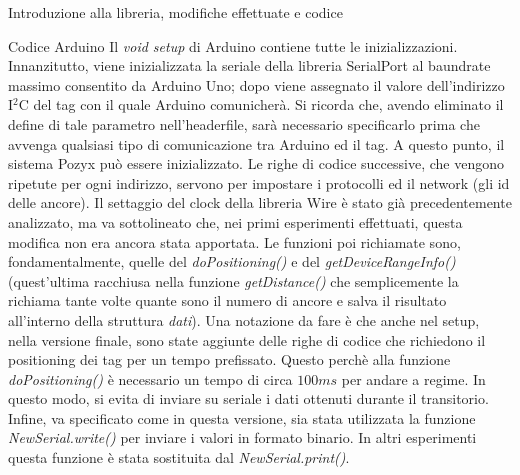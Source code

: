 \documentclass[12pt]{report}
\begin{document}
\begin{section}{Introduzione alla libreria, modifiche effettuate e codice}
\begin{subsection}{Codice Arduino}
			Il \textit{void setup} di Arduino contiene tutte le inizializzazioni. Innanzitutto, viene inizializzata la seriale della libreria SerialPort al baundrate massimo consentito da Arduino Uno; dopo viene assegnato il valore dell’indirizzo I$^2$C del tag con il quale Arduino comunicherà. Si ricorda che, avendo eliminato il 						define di tale parametro nell'headerfile, sarà necessario specificarlo prima che avvenga qualsiasi tipo di comunicazione tra Arduino ed il tag. A questo punto, il sistema Pozyx può essere inizializzato. Le righe di codice successive, che vengono ripetute per ogni indirizzo, servono per impostare i 	protocolli ed il 						network (gli id delle ancore). Il settaggio del clock della libreria Wire è stato già precedentemente analizzato, ma va sottolineato che, nei primi esperimenti effettuati, questa modifica non era ancora stata apportata. Le funzioni poi richiamate sono, fondamentalmente, quelle del \textit{doPositioning()} e del 						\textit{getDeviceRangeInfo()} (quest’ultima racchiusa nella funzione \textit{getDistance()} che semplicemente la richiama tante volte quante sono il numero di ancore e salva il risultato all’interno della struttura \textit{dati}). Una notazione da fare è che anche nel setup, nella versione finale, sono state aggiunte 				delle righe di codice che richiedono il positioning dei tag per un tempo prefissato. Questo perchè alla funzione \textit{doPositioning()} è necessario un tempo di circa $100ms$ per andare a regime. In questo modo, si evita di inviare su seriale i dati ottenuti durante il transitorio. Infine, va specificato come in 						questa versione, sia stata utilizzata la funzione \textit{NewSerial.write()} per inviare i valori in formato binario. In altri esperimenti questa funzione è stata sostituita dal \textit{NewSerial.print()}.

		\end{subsection}

	\end{section}
	\newpage
\end{document}
